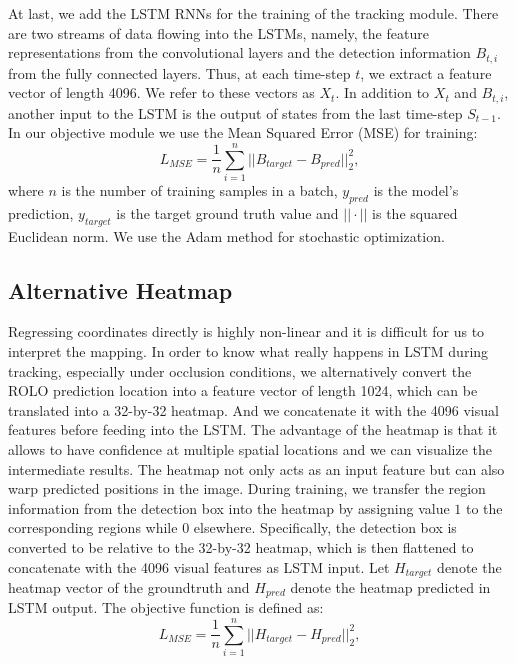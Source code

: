 \documentclass{article}
\begin{document}
At last, we add the LSTM RNNs for the training of the tracking module. There are two streams of data flowing into the LSTMs, namely, the feature representations from the convolutional layers and the detection information $B_{t,i}$ from the fully connected layers. 
Thus, at each time-step $t$, we extract a feature vector of length 4096. We refer to these vectors as $X_{t}$. In addition to $X_{t}$ and $B_{t,i}$, another input to the LSTM is the output of states from the last time-step $S_{t-1}$.
In our objective module we use the Mean Squared Error (MSE) for training:
\begin{equation}
L_{MSE} = \frac{1}{n} \sum_{i=1}^{n} ||B_{target} - B_{pred} ||_{2}^{2},
\end{equation}
where $n$ is the number of training samples in a batch, $y_{pred}$ is the model’s prediction, $y_{target}$ is the target ground truth value and $||\cdot||$ is the squared Euclidean norm. We use the Adam method for stochastic optimization.

\subsection{Alternative Heatmap}
Regressing coordinates directly is highly non-linear and it is difficult for us to interpret the mapping. 
In order to know what really happens in LSTM during tracking, especially under occlusion conditions, we alternatively convert the ROLO prediction location into a feature vector of length 1024, which can be translated into a 32-by-32 heatmap. 
And we concatenate it with the 4096 visual features before feeding into the LSTM. 
The advantage of the heatmap is that it allows to have confidence at multiple spatial locations and we can visualize the intermediate results.  
The heatmap not only acts as an input feature but can also warp predicted positions in the image.
During training, we transfer the region information from the detection box into the heatmap by assigning value $1$ to the corresponding regions while $0$ elsewhere. Specifically, the detection box is converted to be relative to the 32-by-32 heatmap, which is then flattened to concatenate with the 4096 visual features as LSTM input.
Let $H_{target}$ denote the heatmap vector of the groundtruth and $H_{pred}$ denote the heatmap predicted in LSTM output. The objective function is defined as:
\begin{equation}
	L_{MSE} = \frac{1}{n} \sum_{i=1}^{n} ||H_{target} - H_{pred} ||_{2}^{2},
\end{equation} 
\end{document}
